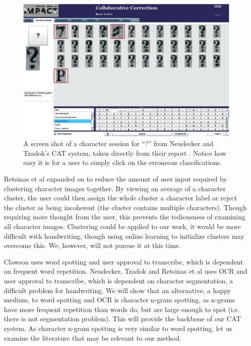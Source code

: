 \documentclass[ms]{byuprop}
\begin{document}
\begin{figure}
    \centering
    \includegraphics[width=.9\textwidth]{carpet}
    \caption{A screen shot of a character session for ``?'' from Neudecker and Tzadok's CAT system, taken directly from their report \cite{Neudecker2010}. Notice how easy it is for a user to simply click on the erroneous classifications.}
    \label{fig:carpet}
\end{figure}

Retsinas et al\cite{Retsinas2015} expanded on \cite{Neudecker2010} to reduce the amount of user input required by clustering character images together. By viewing an average of a character cluster, the user could then assign the whole cluster a character label or reject the cluster as being incoherent (the cluster contains multiple characters). Though requiring more thought from the user, this prevents the tediousness of examining all character images. Clustering could be applied to our work, it would be more difficult with handwriting, though using online learning to initialize clusters may overcome this. We, however, will not pursue it at this time.



Clawson\cite{Clawson2014} uses word spotting and user approval to transcribe, which is dependent on frequent word repetition. Neudecker, Tzadok\cite{Neudecker2010} and Retsinas et al\cite{Retsinas2015} uses OCR and user approval to transcribe, which is dependent on character segmentation, a difficult problem for handwriting.
 We will show that an alternative, a happy medium, to word spotting and OCR is character n-gram spotting, as n-grams have more frequent repetition than words do, but are large enough to spot (i.e. there is not segmentation problem). This will provide the backbone of our CAT system. As character n-gram spotting is very similar to word spotting, let us examine the literature that may be relevant to our method.
\end{document}
